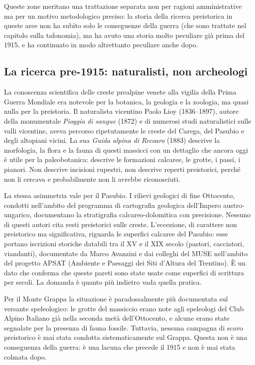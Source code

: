 Queste zone meritano una trattazione separata non per ragioni amministrative ma per un motivo metodologico preciso: la storia della ricerca preistorica in queste aree non ha subìto solo le conseguenze della guerra (che sono trattate nel capitolo sulla tafonomia), ma ha avuto una storia molto peculiare già prima del 1915, e ha continuato in modo altrettanto peculiare anche dopo.

\subsection{La ricerca pre-1915: naturalisti, non archeologi}

La conoscenza scientifica delle creste prealpine venete alla vigilia della Prima Guerra Mondiale era notevole per la botanica, la geologia e la zoologia, ma quasi nulla per la preistoria. Il naturalista vicentino Paolo Lioy (1836--1897), autore della monumentale \emph{Pioggia di sangue} (1872) e di numerosi studi naturalistici sulle valli vicentine, aveva percorso ripetutamente le creste del Carega, del Pasubio e degli altopiani vicini. La sua \emph{Guida alpina di Recoaro} (1883) descrive la morfologia, la flora e la fauna di questi massicci con un dettaglio che ancora oggi è utile per la paleobotanica: descrive le formazioni calcaree, le grotte, i passi, i pianori. Non descrive incisioni rupestri, non descrive reperti preistorici, perché non li cercava e probabilmente non li avrebbe riconosciuti.

La stessa asimmetria vale per il Pasubio. I rilievi geologici di fine Ottocento, condotti nell'ambito del programma di cartografia geologica dell'Impero austro-ungarico, documentano la stratigrafia calcareo-dolomitica con precisione. Nessuno di questi autori cita resti preistorici sulle creste. L'eccezione, di carattere non preistorico ma significativa, riguarda le superfici calcaree del Pasubio: esse portano iscrizioni storiche databili tra il XV e il XIX secolo (pastori, cacciatori, viandanti), documentate da Marco Avanzini e dai colleghi del MUSE nell'ambito del progetto APSAT (Ambiente e Paesaggi dei Siti d'Altura del Trentino). È un dato che conferma che queste pareti sono state usate come superfici di scrittura per secoli. La domanda è quanto più indietro vada quella pratica.

Per il Monte Grappa la situazione è paradossalmente più documentata sul versante speleologico: le grotte del massiccio erano note agli speleologi del Club Alpino Italiano già nella seconda metà dell'Ottocento, e alcune erano state segnalate per la presenza di fauna fossile. Tuttavia, nessuna campagna di scavo preistorico è mai stata condotta sistematicamente sul Grappa. Questa non è una conseguenza della guerra: è una lacuna che precede il 1915 e non è mai stata colmata dopo.

